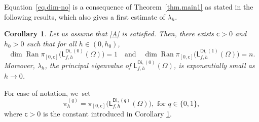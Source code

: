 \documentclass[10pt]{amsart}
\newcommand{\quand}{\quad\text{and}\quad}
\DeclareMathOperator{\range}{Ran}\let\Ran\range
\theoremstyle{plain}
\newtheorem{corollary}[proposition]{Corollary}
\theoremstyle{definition}
\begin{document}
Equation~\eqref{eq.dim-no} is a consequence of Theorem~\ref{thm.main1} as stated in the following results, which also gives a first estimate of $\lambda_h$.
\begin{corollary}\label{thm-pc}
Let us assume that \ref{A} is satisfied. Then, there exists $\mathsf c>0$ and $h_0>0$ such that for all $h \in (0,h_0)$,
\[
\dim \range \pi_{[0,\mathsf c]} \bigl(\mathsf L^{\mathsf{Di},(0)}_{f,h}(\Omega)\bigr)
=1 \quand \dim \range \pi_{[0,\mathsf c]} \bigl(\mathsf L^{\mathsf{Di},(1)}_{f,h}(\Omega)\bigr) =n.
\]
Moreover, $\lambda_h$, the principal eigenvalue of $\mathsf L^{\mathsf{Di},(0)}_{f,h}(\Omega)$, is exponentially small as $h\to 0$.
\end{corollary}

For ease of notation, we~set
\begin{equation}
\label{eq.proj}
\pi_h^{(q)}= \pi_{[0,\mathsf c]} \bigl(\mathsf L^{\mathsf{Di},(q)}_{f,h}(\Omega)\bigr), \text{ for $q\in \{0,1\}$},
\end{equation}
where $\mathsf c>0$ is the constant introduced in Corollary \ref{thm-pc}.
\end{document}
